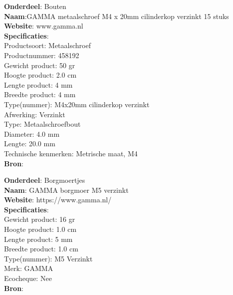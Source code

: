 \textbf{Onderdeel}: Bouten\\
\textbf{Naam}:GAMMA metaalschroef M4 x 20mm cilinderkop verzinkt 15 stuks\\
\textbf{Website}: www.gamma.nl\\
\textbf{Specificaties}:\\
Productsoort: Metaalschroef\\
Productnummer: 458192\\
Gewicht product: 50 gr\\
Hoogte product: 2.0 cm\\
Lengte product: 4 mm\\
Breedte product: 4 mm\\
Type(nummer): M4x20mm cilinderkop verzinkt\\
Afwerking: Verzinkt\\
Type: Metaalschroefbout\\
Diameter: 4.0 mm\\
Lengte: 20.0 mm\\
Technische kenmerken: Metrische maat, M4\\
\textbf{Bron}: \cite{gamma}
\vspace{\baselineskip}

\textbf{Onderdeel}: Borgmoertjes \\
\textbf{Naam}: GAMMA borgmoer M5 verzinkt \\
\textbf{Website}: https://www.gamma.nl/ \\
\textbf{Specificaties}: \\
Gewicht product: 16 gr \\
Hoogte product: 1.0 cm \\
Lengte product: 5 mm \\
Breedte product: 1.0 cm \\
Type(nummer): M5 Verzinkt \\
Merk: GAMMA \\
Ecocheque: Nee \\
\textbf{Bron}: \cite{gamma} \\
\vspace{\baselineskip} \\






